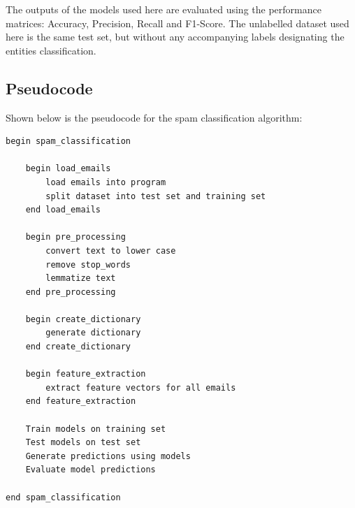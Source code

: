 \documentclass[11pt, a4paper]{article}
\begin{document}
The outputs of the models used here are evaluated using the performance matrices: Accuracy, Precision, Recall and F1-Score. The unlabelled dataset used here is the same test set, but without any accompanying labels designating the entities classification.

\subsection{Pseudocode}
Shown below is the pseudocode for the spam classification algorithm:
\begin{lstlisting}[frame=single]
begin spam_classification

    begin load_emails
        load emails into program
        split dataset into test set and training set
    end load_emails
	
    begin pre_processing
        convert text to lower case
        remove stop_words
        lemmatize text
    end pre_processing
	
    begin create_dictionary
        generate dictionary
    end create_dictionary
	
    begin feature_extraction
        extract feature vectors for all emails
    end feature_extraction
	
    Train models on training set
    Test models on test set
    Generate predictions using models
    Evaluate model predictions
    
end spam_classification
\end{lstlisting}
\newpage
\end{document}
